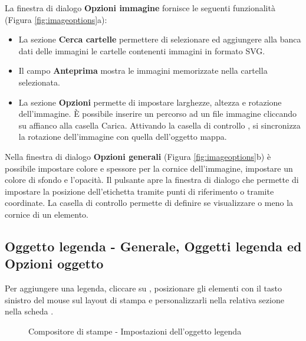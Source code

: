 
La finestra di dialogo \textbf{Opzioni immagine} fornisce le seguenti funzionalità (Figura \ref{fig:imageoptions}a):

\begin{itemize}[label=--]
\item La sezione \textbf{Cerca cartelle} permettere di selezionare ed aggiungere 
alla banca dati delle immagini le cartelle contenenti immagini in formato SVG.
\item Il campo \textbf{Anteprima} mostra le immagini memorizzate nella cartella selezionata.
\item La sezione \textbf{Opzioni} permette di impostare larghezze, altezza e rotazione dell'immagine.
È possibile inserire un percorso ad un file immagine cliccando su  affianco alla casella Carica.
Attivando la casella di controllo , si sincronizza la rotazione 
dell'immagine con quella dell'oggetto mappa.
\end{itemize}


Nella finestra di dialogo \textbf{Opzioni generali} (Figura \ref{fig:imageoptions}b) è possibile impostare colore e spessore per la cornice dell'immagine, impostare 
un colore di sfondo e l'opacità. Il pulsante  apre la finestra di 
dialogo  che permette di impostare la posizione dell'etichetta 
tramite punti di riferimento o tramite coordinate.
La casella di controllo  permette di definire se visualizzare o 
meno la cornice di un elemento.

\subsection{Oggetto legenda - Generale, Oggetti legenda ed Opzioni oggetto}

Per aggiungere una legenda, cliccare su ,
posizionare gli elementi con il tasto sinistro del mouse sul layout di stampa e personalizzarli 
nella relativa sezione nella scheda .

\begin{figure}[h]
\centering
   \hspace{1cm}
   \hspace{1cm}
   \caption{Compositore di stampe - Impostazioni dell'oggetto legenda \nixcaption}\label{fig:legendoptions}
\end{figure}

